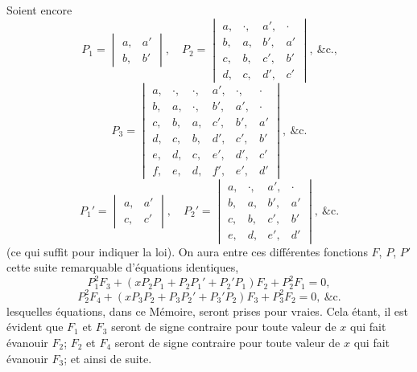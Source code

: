 \documentclass[11pt]{article}
\begin{document}
\medskip
Soient encore
\[
P_{1} = \begin{vmatrix} a, & a' \\ b, & b' \end{vmatrix},\quad
P_{2} = \begin{vmatrix} a, & \cdot, & a', & \cdot \\ b, & a, & b', & a' \\ c, & b, & c', & b' \\ d, & c, & d', & c' \end{vmatrix},\ \&\text{c.,}
\]
\[
P_{3} = \begin{vmatrix} a, & \cdot, & \cdot, & a', & \cdot, & \cdot \\ b, & a, & \cdot, & b', & a', & \cdot \\ c, & b, & a, & c', & b', & a' \\ d, & c, & b, & d', & c', & b' \\ e, & d, & c, & e', & d', & c' \\ f, & e, & d, & f', & e', & d' \end{vmatrix},\ \&\text{c.}
\]
\[
P_{1}' = \begin{vmatrix} a, & a' \\ c, & c' \end{vmatrix},\quad
P_{2}' = \begin{vmatrix} a, & \cdot, & a', & \cdot \\ b, & a, & b', & a' \\ c, & b, & c', & b' \\ e, & d, & e', & d' \end{vmatrix},\ \&\text{c.}
\]
(ce qui suffit pour indiquer la loi). On aura entre ces diff\'erentes fonctions $F$, $P$, $P'$
cette suite remarquable d'\'equations identiques,
\[
P_{1}^{2} F_{3} + (xP_{2}P_{1} + P_{2}P_{1}' + P_{2}'P_{1})F_{2} + P_{2}^{2}F_{1} = 0,
\]
\[
P_{2}^{2} F_{4} + (xP_{3}P_{2} + P_{3}P_{2}' + P_{3}'P_{2})F_{3} + P_{3}^{2}F_{2} = 0,\ \&\text{c.}
\]
lesquelles \'equations, dans ce M\'emoire, seront prises pour vraies. Cela \'etant, il est
\'evident que $F_{1}$ et $F_{3}$ seront de signe contraire pour toute valeur de $x$ qui fait \'evanouir
$F_{2}$; $F_{2}$ et $F_{4}$ seront de signe contraire pour toute valeur de $x$ qui fait \'evanouir $F_{3}$; et
ainsi de suite.

\end{document}
